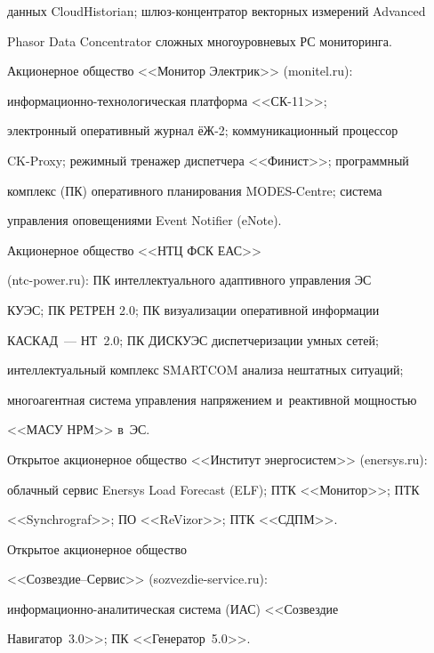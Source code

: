 данных CloudHistorian; шлюз-кон\-цен\-тра\-тор векторных измерений Advanced 


Phasor Data Concentrator сложных многоуровневых РС мониторинга. 





Акционерное общество <<Монитор Электрик>> ({\small {\sf monitel.ru}}):  


ин\-фор\-ма\-ци\-он\-но-тех\-но\-ло\-ги\-че\-ская платформа <<СК-11>>; 


электронный оперативный журнал \mbox{ёЖ-2}; коммуникационный процессор 


 CK-Proxy; режимный тренажер диспетчера <<Финист>>; программный 


комплекс (ПК) оперативного планирования MODES-Centre; сис\-тема 


управления оповещениями Event Notifier (eNote).





 Акционерное общество <<НТЦ ФСК ЕАС>> 


({\small {\sf ntc-power.ru}}): ПК интеллектуального адаптивного управления ЭС 


КУЭС; ПК РЕТРЕН 2.0; ПК визуализации оперативной информации 


КАСКАД~--- НТ~2.0; ПК ДИСКУЭС диспетчеризации умных сетей; 


интеллектуальный комплекс SMARTCOM анализа нештатных ситуаций; 


многоагентная система управления напряжением и~реактивной мощ\-ностью 


<<МАСУ НРМ>> в~ЭС. 





Открытое акционерное общество <<Институт энергосистем>> (enersys.ru): 


облачный сервис Enersys Load Forecast (ELF); ПТК <<Монитор>>; ПТК 


<<Synchrograf>>; ПО <<ReVizor>>; ПТК <<СДПМ>>. 





Открытое акционерное общество  


<<Созвездие--Сер\-вис>> ({\small {\sf sozvezdie-service.ru}}):  


ин\-фор\-ма\-ци\-он\-но-ана\-ли\-ти\-че\-ская система (ИАС) <<Созвездие 


Навигатор~3.0>>; ПК <<Генератор~5.0>>. 





